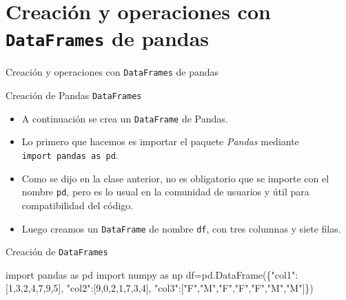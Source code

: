 \documentclass[
  ignorenonframetext,
  aspectratio=169,
  spanish,
]{beamer}
\newenvironment{Shaded}{\begin{snugshade}}{\end{snugshade}}
\newcommand{\DecValTok}[1]{\textcolor[rgb]{0.68,0.00,0.00}{#1}}
\newcommand{\ImportTok}[1]{\textcolor[rgb]{0.00,0.46,0.62}{#1}}
\newcommand{\NormalTok}[1]{\textcolor[rgb]{0.00,0.23,0.31}{#1}}
\newcommand{\OperatorTok}[1]{\textcolor[rgb]{0.37,0.37,0.37}{#1}}
\newcommand{\StringTok}[1]{\textcolor[rgb]{0.13,0.47,0.30}{#1}}
\begin{document}
\section{\texorpdfstring{Creación y operaciones con \texttt{DataFrames}
de
pandas}{Creación y operaciones con DataFrames de pandas}}\label{creaciuxf3n-y-operaciones-con-dataframes-de-pandas}

\begin{frame}[fragile]{Creación y operaciones con \texttt{DataFrames} de
pandas}
\begin{block}{Creación de Pandas \texttt{DataFrames}}
\label{creaciuxf3n-de-pandas-dataframes}

\begin{itemize}
\item
  A continuación se crea un \texttt{DataFrame} de Pandas.
\item
  Lo primero que hacemos es importar el paquete \emph{Pandas} mediante
  \texttt{import\ pandas\ as\ pd}.
\item
  Como se dijo en la clase anterior, no es obligatorio que se importe
  con el nombre \texttt{pd}, pero es lo usual en la comunidad de
  usuarios y útil para compatibilidad del código.
\item
  Luego creamos un \texttt{DataFrame} de nombre \texttt{df}, con tres
  columnas y siete filas.
\end{itemize}
\end{block}

\begin{block}{Creación de \texttt{DataFrames}}
\label{creaciuxf3n-de-dataframes}
\begin{Shaded}
\begin{Highlighting}[]
\ImportTok{import}\NormalTok{ pandas }\ImportTok{as}\NormalTok{ pd}
\ImportTok{import}\NormalTok{ numpy  }\ImportTok{as}\NormalTok{ np}
\NormalTok{df}\OperatorTok{=}\NormalTok{pd.DataFrame(\{}\StringTok{"col1"}\NormalTok{:[}\DecValTok{1}\NormalTok{,}\DecValTok{3}\NormalTok{,}\DecValTok{2}\NormalTok{,}\DecValTok{4}\NormalTok{,}\DecValTok{7}\NormalTok{,}\DecValTok{9}\NormalTok{,}\DecValTok{5}\NormalTok{],}
                \StringTok{"col2"}\NormalTok{:[}\DecValTok{9}\NormalTok{,}\DecValTok{0}\NormalTok{,}\DecValTok{2}\NormalTok{,}\DecValTok{1}\NormalTok{,}\DecValTok{7}\NormalTok{,}\DecValTok{3}\NormalTok{,}\DecValTok{4}\NormalTok{],}
                \StringTok{"col3"}\NormalTok{:[}\StringTok{"F"}\NormalTok{,}\StringTok{"M"}\NormalTok{,}\StringTok{"F"}\NormalTok{,}\StringTok{"F"}\NormalTok{,}\StringTok{"F"}\NormalTok{,}\StringTok{"M"}\NormalTok{,}\StringTok{"M"}\NormalTok{]\})}
\end{Highlighting}
\end{Shaded}


\end{block}
\end{frame}
\end{document}
